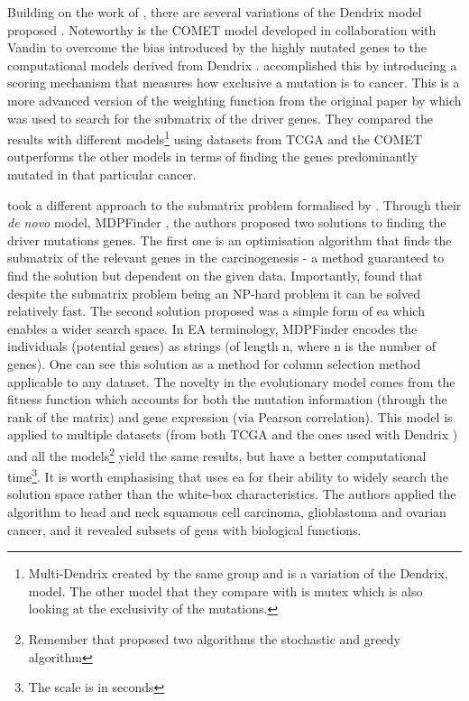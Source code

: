 Building on the work of \citeauthor{Vandin2012-cf}, there are several variations of the Dendrix model proposed \citep{Leiserson2013-da,Szczurek2014-dh,Leiserson2015-yk}. Noteworthy is the COMET \citep{Leiserson2015-yk} model developed in collaboration with Vandin to overcome the bias introduced by the highly mutated genes to the computational models derived from Dendrix \citep{Vandin2012-ns}. \cite{Leiserson2015-yk} accomplished this by introducing a scoring mechanism that measures how exclusive a mutation is to cancer. This is a more advanced version of the weighting function from the original paper by \citet{Vandin2012-cf} which was used to search for the submatrix of the driver genes. They compared the results with different models\footnote{Multi-Dendrix \citep{Leiserson2013-da} created by the same group and is a variation of the Dendrix, \citet{Vandin2012-cf} model. The other model that they compare with is mutex \citep{Babur2015-qk} which is also looking at the exclusivity of the mutations.} using datasets from TCGA and the COMET outperforms the other models \citep{Leiserson2013-da,Szczurek2014-dh} in terms of finding the genes predominantly mutated in that particular cancer.

\citet{Zhao2012-wj} took a different approach to the submatrix problem formalised by \citet{Vandin2012-cf}. Through their \textit{de novo} model, MDPFinder \citep{Zhao2012-wj}, the authors proposed two solutions to finding the driver mutations genes. The first one is an optimisation algorithm that finds the submatrix of the relevant genes in the carcinogenesis - a method guaranteed to find the solution but dependent on the given data. Importantly, \citet{Zhao2012-wj} found that despite the submatrix problem being an NP-hard problem \citep{Vandin2012-cf} it can be solved relatively fast. The second solution proposed was a simple form of \acrfull{ea} which enables a wider search space. In EA terminology, MDPFinder encodes the individuals (potential genes) as strings (of length n, where n is the number of genes). One can see this solution as a method for column selection method applicable to any dataset. The novelty in the evolutionary model comes from the fitness function which accounts for both the mutation information (through the rank of the matrix) and gene expression (via Pearson correlation). This model is applied to multiple datasets (from both TCGA and the ones used with Dendrix \citep{Vandin2012-cf}) and all the models\footnote{Remember that \citet{Vandin2012-cf} proposed two algorithms the stochastic and greedy algorithm} yield the same results, but \citet{Zhao2012-wj} have a better computational time\footnote{The scale is in seconds}. It is worth emphasising that \citet{Zhao2012-wj} uses \acrshort{ea} for their ability to widely search the solution space rather than the white-box characteristics. The authors applied the algorithm to head and neck squamous cell carcinoma, glioblastoma and ovarian cancer, and it revealed subsets of gens with biological functions.

